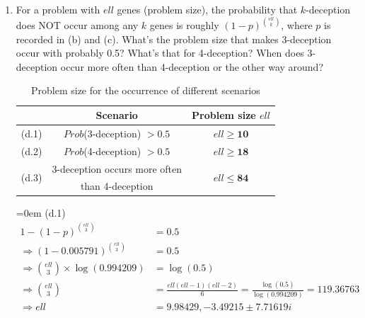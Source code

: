 \documentclass{article}
\begin{document}
\begin{enumerate}[label=(\alph*)]
      \item
      For a problem with $ell$ genes (problem size), the probability that $k$-deception 
      does NOT occur among any $k$ genes is roughly $(1 - p)^{ell \choose k}$, 
      where $p$ is recorded in (b) and (c). 
      What’s the problem size that makes 3-deception occur with probably 0.5? 
      What’s that for 4-deception? 
      When does 3-deception occur more often than 4-deception or the other way around?


            \begin{table}[h]
                  \setlength{\tabcolsep}{1.8em}
                  \renewcommand{\arraystretch}{1.3}
                  \centering
                  \begin{tabular}{ccc}
                        \hline
                         & Scenario & Problem size $ell$ \\
                        \hline
                        (d.1) & $Prob$(3-deception) $> 0.5$ & $ell \ge \textbf{10}$ \\
                        (d.2) & $Prob$(4-deception) $> 0.5$ & $ell \ge \textbf{18}$ \\
                        \multirow{2}{*}{(d.3)} & 3-deception occurs more often & \multirow{2}{*}{$ell \le \textbf{84}$} \\
                         & than 4-deception &  \\
                        \hline
                  \end{tabular}
                  \caption{Problem size for the occurrence of different scenarios}
            \end{table}

            \parindent=0em
            (d.1)
            \begin{equation*}
            \begin{aligned}
                  1 - (1 - p)^{ell \choose 3} &= 0.5 \\
                  \Rightarrow (1- 0.005791)^{ell \choose 3} &= 0.5 \\
                  \Rightarrow {ell \choose 3} \times \log(0.994209) &= \log(0.5) \\
                  \Rightarrow {ell \choose 3} &= \frac{ell(ell-1)(ell-2)}{6} = \frac{\log(0.5)}{\log(0.994209)} = 119.36763 \\
                  \Rightarrow ell &= 9.98429, -3.49215 \pm 7.71619i \\
            \end{aligned}
            \end{equation*}


\end{enumerate}
\end{document}
